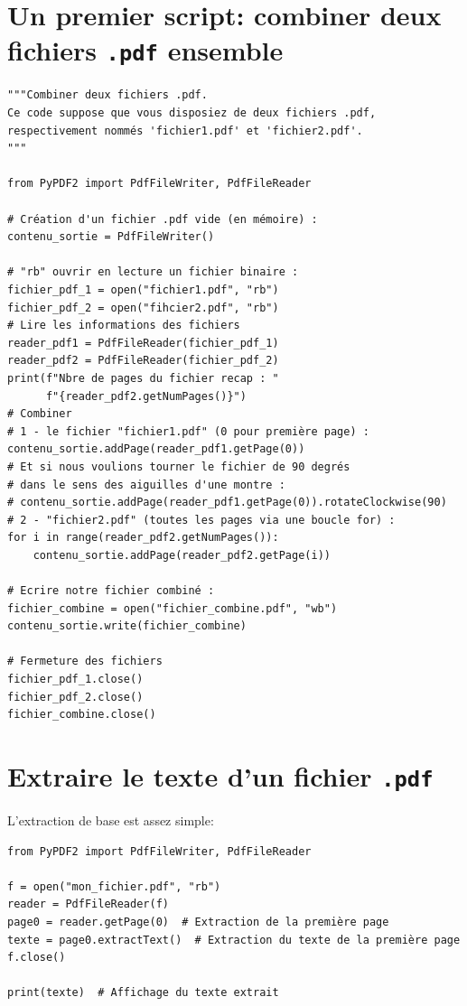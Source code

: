 \documentclass[a4paper,12pt]{book}
\begin{document}
\section{Un premier script: combiner deux fichiers \texttt{.pdf} ensemble}
\begin{lstlisting}
"""Combiner deux fichiers .pdf.
Ce code suppose que vous disposiez de deux fichiers .pdf,
respectivement nommés 'fichier1.pdf' et 'fichier2.pdf'.
"""

from PyPDF2 import PdfFileWriter, PdfFileReader

# Création d'un fichier .pdf vide (en mémoire) :
contenu_sortie = PdfFileWriter()

# "rb" ouvrir en lecture un fichier binaire :
fichier_pdf_1 = open("fichier1.pdf", "rb")
fichier_pdf_2 = open("fihcier2.pdf", "rb")
# Lire les informations des fichiers
reader_pdf1 = PdfFileReader(fichier_pdf_1)
reader_pdf2 = PdfFileReader(fichier_pdf_2)
print(f"Nbre de pages du fichier recap : "
      f"{reader_pdf2.getNumPages()}")
# Combiner
# 1 - le fichier "fichier1.pdf" (0 pour première page) :
contenu_sortie.addPage(reader_pdf1.getPage(0))
# Et si nous voulions tourner le fichier de 90 degrés
# dans le sens des aiguilles d'une montre :
# contenu_sortie.addPage(reader_pdf1.getPage(0)).rotateClockwise(90)
# 2 - "fichier2.pdf" (toutes les pages via une boucle for) :
for i in range(reader_pdf2.getNumPages()):
    contenu_sortie.addPage(reader_pdf2.getPage(i))

# Ecrire notre fichier combiné :
fichier_combine = open("fichier_combine.pdf", "wb")
contenu_sortie.write(fichier_combine)

# Fermeture des fichiers
fichier_pdf_1.close()
fichier_pdf_2.close()
fichier_combine.close()
\end{lstlisting}
\medskip

\section{Extraire le texte d'un fichier \texttt{.pdf}}
L'extraction de base est assez simple:
\begin{lstlisting}
from PyPDF2 import PdfFileWriter, PdfFileReader

f = open("mon_fichier.pdf", "rb") 
reader = PdfFileReader(f)
page0 = reader.getPage(0)  # Extraction de la première page
texte = page0.extractText()  # Extraction du texte de la première page
f.close()

print(texte)  # Affichage du texte extrait
\end{lstlisting}
\medskip
\end{document}

